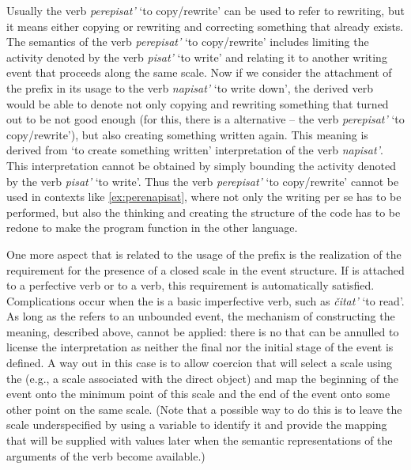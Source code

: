 Usually the verb \textit{perepisat'} `to copy/rewrite' can be used to refer to rewriting, but it means either copying or rewriting and correcting something that already exists. The semantics of the verb \textit{perepisat'} `to copy/rewrite' includes limiting the activity denoted by the verb \textit{pisat'} `to write' and relating it to another writing event that proceeds along the same scale. Now if we consider the attachment of the  prefix in its  usage to the verb \textit{napisat'} `to write down', the derived verb would be able to denote not only copying and rewriting something that turned out to be not good enough (for this, there is a  alternative -- the verb \textit{perepisat'} `to copy/rewrite'), but also creating something written again. This meaning is derived from `to create something written' interpretation of the verb \textit{napisat'}. This interpretation cannot be obtained by simply bounding the activity denoted by the verb \textit{pisat'} `to write'. Thus the verb \textit{perepisat'} `to copy/rewrite' cannot be used in contexts like \ref{ex:perenapisat}, where not only the writing per se has to be performed, but also the thinking and creating the structure of the code has to be redone to make the program function in the other language.

One more aspect that is related to the  usage of the prefix  is the realization of the requirement for the presence of a closed scale in the event structure. If  is attached to a perfective verb or to a  verb, this requirement is automatically satisfied. Complications occur when the  is a basic imperfective verb, such as \textit{\v{c}itat'} `to read'. As long as the  refers to an unbounded event, the mechanism of constructing the  meaning, described above, cannot be applied: there is no  that can be annulled to license the  interpretation as neither the final nor the initial stage of the event is defined. A way out in this case is to allow coercion that will select a scale using the  (e.g., a scale associated with the direct object) and map the beginning of the event onto the minimum point of this scale and the end of the event onto some other point on the same scale. (Note that a possible way to do this is to leave the scale underspecified by using a variable to identify it and provide the mapping that will be supplied with values later when the semantic representations of the arguments of the verb become available.)

